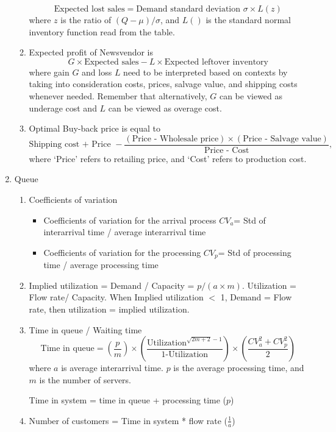 \documentclass[twoside, 12pt]{article}
\begin{document}
\begin{enumerate}
\begin{enumerate}
	\[
	\text{Expected lost sales}= \text{Demand standard deviation } \sigma \times  L(z)
	\]
	where $z$ is the ratio of $(Q-\mu)/\sigma$, and $L()$ is the standard normal inventory function read from the table. 
	
	

	
	\item Expected profit of Newsvendor is
	\[
	G \times \text{Expected sales}  - L \times \text{Expected leftover inventory}
	\]
	where gain $G$ and loss $L$ need to be interpreted based on contexts by taking into consideration costs, prices, salvage value, and shipping costs whenever needed. Remember that alternatively, $G$ can be viewed as underage cost and $L$ can be viewed as overage cost.
	
	\item Optimal Buy-back price  is equal to 
	\[
	\text{Shipping cost + Price } -    \frac{(\text{Price - Wholesale price})\times(\text{Price - Salvage value})}{\text{Price - Cost}},
	\]
	where `Price' refers to retailing price, and `Cost' refers to production cost. 
	
\end{enumerate}

\item Queue
\begin{enumerate}
	\item Coefficients of variation
	\begin{itemize}
		\item Coefficients of variation for the arrival process $CV_a $= Std of interarrival time / average interarrival time 
		\item Coefficients of variation for the processing $CV_p $=  Std of processing time / average processing time
	\end{itemize}
	\item  Implied utilization = Demand / Capacity = $p/(a\times m)$. Utilization = Flow rate/ Capacity. When Implied utilization $<$ 1, Demand = Flow rate, then utilization = implied utilization.
	
	\item Time in queue / Waiting time
	\[
	\text{Time in queue} = \left(\frac{p}{m} \right) \times \left( \frac{\text{Utilization}^{\sqrt{2m+2}- 1}}{\text{1-Utilization}}\right) \times \left( \frac{CV_a^2 +CV_p^2}{2} \right)
	\]
	where $a$ is average interarrival time. $p$ is the average processing time, and $m$ is the number of servers.
	
	Time in system = time in queue + processing time ($p$)
	
	\item Number of customers = Time in system * flow rate  ($\frac{1}{a}$)
	
\end{enumerate}

\end{enumerate}
\end{document}
